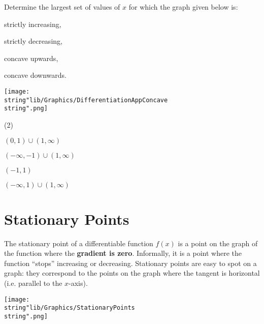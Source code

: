 \documentclass[11pt,a4paper]{book}
\begin{document}
\begin{example}

Determine the largest set of values of $x$ for which the graph given
below is:

\begin{tasks}[label=(\alph*),label-width=3.5ex]

\task  strictly increasing,

\task  strictly decreasing,

\task  concave upwards,

\task  concave downwards.

\end{tasks}
\begin{center}
\texttt{[image: \\string"lib/Graphics/DifferentiationAppConcave\\string".png]}
\par\end{center}

\Solution

\begin{tasks}[label=(\alph*),label-width=3.5ex](2)

\task  $\left(0,1\right)\cup\left(1,\infty\right)$

\task  $\left(-\infty,-1\right)\cup\left(1,\infty\right)$

\task  $\left(-1,1\right)$

\task  $\left(-\infty,1\right)\cup\left(1,\infty\right)$

\end{tasks}

\end{example}


\newpage{}

\section{Stationary Points}

The stationary point of a differentiable function $f(x)$ is a point
on the graph of the function where the \textbf{gradient is zero}.
Informally, it is a point where the function ``stops'' increasing
or decreasing. Stationary points are easy to spot on a graph: they
correspond to the points on the graph where the tangent is horizontal
(i.e. parallel to the $x$-axis).
\begin{center}
\texttt{[image: \\string"lib/Graphics/StationaryPoints\\string".png]}
\par\end{center}
\end{document}
